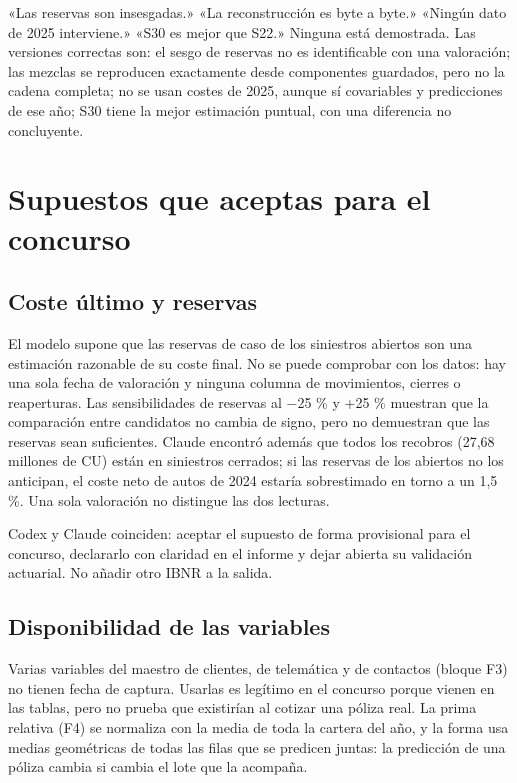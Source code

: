 \documentclass[11pt,a4paper]{article}
\begin{document}
\begin{cuidado}
«Las reservas son insesgadas.» «La reconstrucción es byte a byte.» «Ningún dato de 2025 interviene.» «S30 es mejor que S22.» Ninguna está demostrada. Las versiones correctas son: el sesgo de reservas no es identificable con una valoración; las mezclas se reproducen exactamente desde componentes guardados, pero no la cadena completa; no se usan costes de 2025, aunque sí covariables y predicciones de ese año; S30 tiene la mejor estimación puntual, con una diferencia no concluyente.
\end{cuidado}

\section{Supuestos que aceptas para el concurso}

\subsection{Coste último y reservas}
El modelo supone que las reservas de caso de los siniestros abiertos son una estimación razonable de su coste final. No se puede comprobar con los datos: hay una sola fecha de valoración y ninguna columna de movimientos, cierres o reaperturas. Las sensibilidades de reservas al −25 \% y +25 \% muestran que la comparación entre candidatos no cambia de signo, pero no demuestran que las reservas sean suficientes. Claude encontró además que todos los recobros (27,68 millones de CU) están en siniestros cerrados; si las reservas de los abiertos no los anticipan, el coste neto de autos de 2024 estaría sobrestimado en torno a un 1,5 \%. Una sola valoración no distingue las dos lecturas.

\begin{pendiente}[P4 · reservas]
Codex y Claude coinciden: aceptar el supuesto de forma provisional para el concurso, declararlo con claridad en el informe y dejar abierta su validación actuarial. No añadir otro IBNR a la salida.
\end{pendiente}

\subsection{Disponibilidad de las variables}
Varias variables del maestro de clientes, de telemática y de contactos (bloque F3) no tienen fecha de captura. Usarlas es legítimo en el concurso porque vienen en las tablas, pero no prueba que existirían al cotizar una póliza real. La prima relativa (F4) se normaliza con la media de toda la cartera del año, y la forma usa medias geométricas de todas las filas que se predicen juntas: la predicción de una póliza cambia si cambia el lote que la acompaña.
\end{document}
